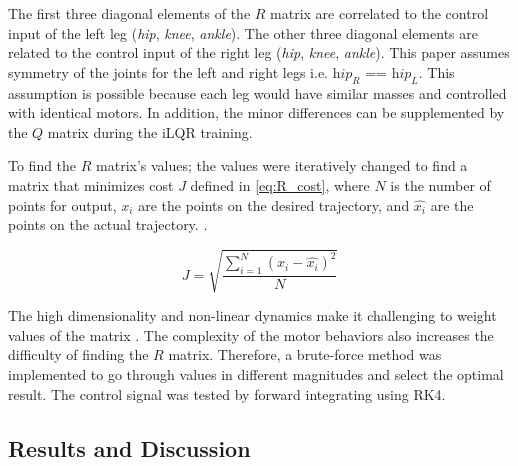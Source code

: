 The first three diagonal elements of the $R$ matrix are correlated to the control input of the left leg (\textit{hip}, \textit{knee}, \textit{ankle}). The other three diagonal elements are related to the control input of the right leg (\textit{hip}, \textit{knee}, \textit{ankle}). This paper assumes symmetry of the joints for the left and right legs i.e. $\textit{hip}_R$ == $\textit{hip}_L$.  This assumption is possible because each leg would have similar masses and controlled with identical motors. In addition, the minor differences can be supplemented by the $Q$ matrix during the iLQR training.  

To find the $R$ matrix's values; the values were iteratively changed to find a matrix that minimizes cost $J$ defined in \autoref{eq:R_cost}, where $N$ is the number of points for output, $x_i$ are the points on the desired trajectory, and $\hat{x_i}$ are the points on the actual trajectory. 
 \cite{chai2014root}.

\begin{equation}
    J = \sqrt{\frac{\sum_{i=1}^N(x_i-\hat{x_i})^2}{N}}
    \label{eq:R_cost}
\end{equation}

The high dimensionality and non-linear dynamics make it challenging to weight values of the matrix \cite{park2012multi}. The complexity of the motor behaviors also increases the difficulty of finding the $R$ matrix. Therefore, a brute-force method was implemented to go through values in different magnitudes and select the optimal result. The control signal was tested by forward integrating using RK4.  




\subsection{Results and Discussion}



